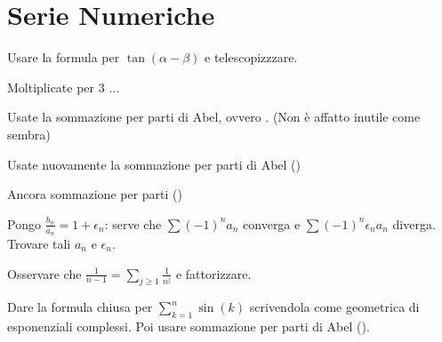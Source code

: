 \section{Serie Numeriche}

 Usare la formula per $\tan(\alpha - \beta)$ e telescopizzzare.

 Moltiplicate per 3 $\ldots$ 

 Usate la sommazione per parti di Abel, ovvero . (Non \`e affatto inutile come sembra)

 Usate nuovamente la sommazione per parti di Abel ()

 Ancora sommazione per parti ()

 Pongo $\frac{b_n}{a_n} = 1 + \epsilon_n$: serve che $\sum (-1)^n a_n$ converga e $\sum (-1)^n \epsilon_n a_n$ diverga. Trovare tali $a_n$ e $\epsilon_n$.

 Osservare che $\frac{1}{n-1} = \sum_{j \ge 1} \frac{1}{n^j}$ e fattorizzare.

 Dare la formula chiusa per $\sum_{k=1}^{n} \sin(k)$ scrivendola come geometrica di esponenziali complessi. Poi usare sommazione per parti di Abel ().
